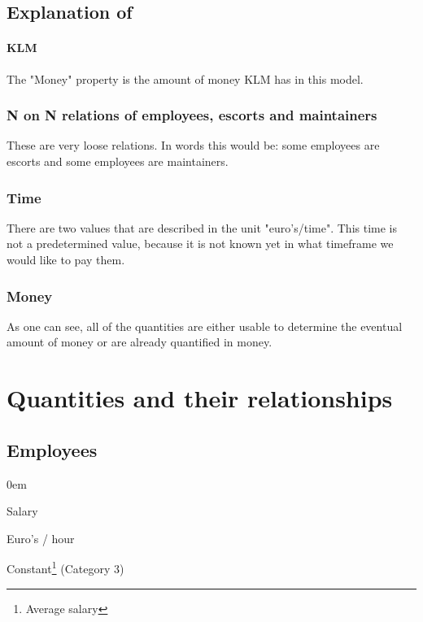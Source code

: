 \documentclass[a4paper, 11pt, notitlepage]{report}
\begin{document}
\section{Explanation of}
\subsubsection{KLM}
The "Money" property is the amount of money KLM has in this model.

\subsection{N on N relations of employees, escorts and maintainers}
These are very loose relations. In words this would be: some employees are escorts and some employees are maintainers.

\subsection{Time}
There are two values that are described in the unit "euro's/time". This time is not a predetermined value, because it is not known yet in what timeframe we would like to pay them.

\subsection{Money}
As one can see, all of the quantities are either usable to determine the eventual amount of money or are already quantified in money.


\setcounter{chapter}{+9}
\chapter{Quantities and their relationships}
	\section{Employees}
	\begin{description}
	\itemsep0em
	\item[Property:] Salary
	\item[Unit:] Euro's / hour
	\item[Role:] Constant\footnote{Average salary}  (Category 3)
	\end{description}
\end{document}
